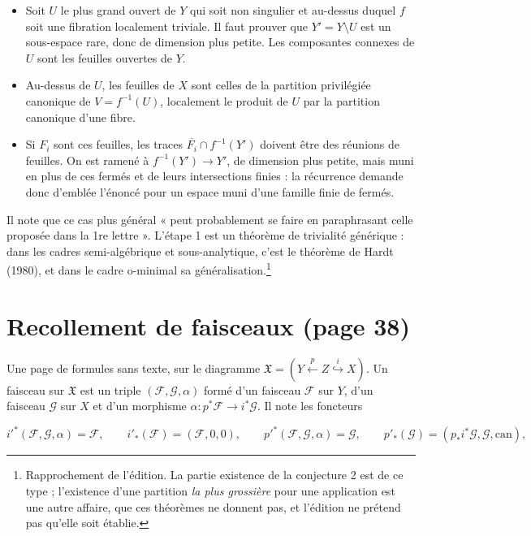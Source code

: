 \documentclass[11pt,a4paper]{article}
\begin{document}
\begin{itemize}
\item[1.] Soit $U$ le plus grand ouvert de $Y$ qui soit non singulier et
  au-dessus duquel $f$ soit une fibration localement triviale. Il faut prouver
  que $Y' = Y \setminus U$ est un sous-espace rare, donc de dimension plus
  petite. Les composantes connexes de $U$ sont les feuilles ouvertes de $Y$.
\item[2.] Au-dessus de $U$, les feuilles de $X$ sont celles de la partition
  privilégiée canonique de $V = f^{-1}(U)$, localement le produit de $U$ par
  la partition canonique d'une fibre.
\item[3.] Si $F_i$ sont ces feuilles, les traces $\overline{F_i} \cap
  f^{-1}(Y')$ doivent être des réunions de feuilles. On est ramené à
  $f^{-1}(Y') \to Y'$, de dimension plus petite, mais muni en plus de ces
  fermés et de leurs intersections finies : la récurrence demande donc
  d'emblée l'énoncé pour un espace muni d'une famille finie de fermés.
\end{itemize}

Il note que ce cas plus général « peut probablement se faire en paraphrasant
celle proposée dans la 1re lettre ». L'étape 1 est un théorème de
trivialité générique : dans les cadres semi-algébrique et sous-analytique,
c'est le théorème de Hardt (1980), et dans le cadre o-minimal sa
généralisation.\footnote{Rapprochement de l'édition. La partie existence de la
conjecture 2 est de ce type ; l'existence d'une partition \emph{la plus
grossière} pour une application est une autre affaire, que ces théorèmes ne
donnent pas, et l'édition ne prétend pas qu'elle soit établie.}

\section*{Recollement de faisceaux (page 38)}

Une page de formules sans texte, sur le diagramme $\mathfrak{X} = (Y
\xleftarrow{p} Z \overset{i}{\hookrightarrow} X)$. Un faisceau sur
$\mathfrak{X}$ est un triple $(\mathcal{F}, \mathcal{G}, \alpha)$ formé d'un
faisceau $\mathcal{F}$ sur $Y$, d'un faisceau $\mathcal{G}$ sur $X$ et d'un
morphisme $\alpha : p^{*}\mathcal{F} \to i^{*}\mathcal{G}$. Il note les foncteurs

\[
  i'^{*}(\mathcal{F}, \mathcal{G}, \alpha) = \mathcal{F}, \qquad
  i'_{*}(\mathcal{F}) = (\mathcal{F}, 0, 0), \qquad
  p'^{*}(\mathcal{F}, \mathcal{G}, \alpha) = \mathcal{G}, \qquad
  p'_{*}(\mathcal{G}) = (p_{*} i^{*} \mathcal{G}, \mathcal{G}, \mathrm{can}),
\]
\end{document}
